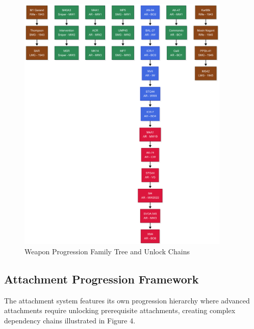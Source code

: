 \documentclass[12pt,a4paper]{article}
\begin{document}
\begin{figure}[H]
    \centering
    \includegraphics[width=0.9\textwidth]{../diagrams/weapon-progression-family-tree-vertical.png}
    \caption{Weapon Progression Family Tree and Unlock Chains}
\end{figure}

\subsection{Attachment Progression Framework}

The attachment system features its own progression hierarchy where advanced attachments require unlocking prerequisite attachments, creating complex dependency chains illustrated in Figure 4.
\end{document}
